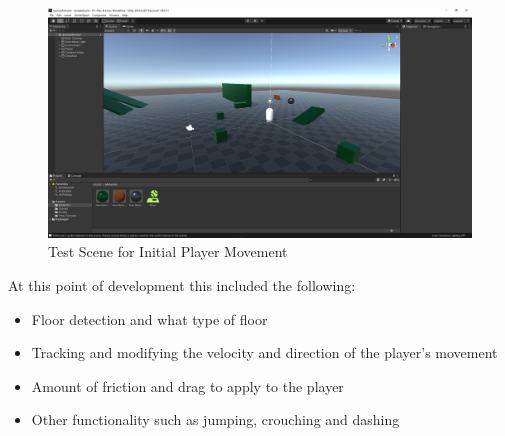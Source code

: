 \begin{figure}[H]
\centering
\includegraphics[scale=0.28]{Figures/testold.png}
\caption{Test Scene for Initial Player Movement}
\label{flrtst}
\end{figure}

\noindent At this point of development this included the following:
\begin{itemize}
\item Floor detection and what type of floor
\item Tracking and modifying the velocity and direction of the player's movement
\item Amount of friction and drag to apply to the player
\item Other functionality such as jumping, crouching and dashing
\end{itemize}

